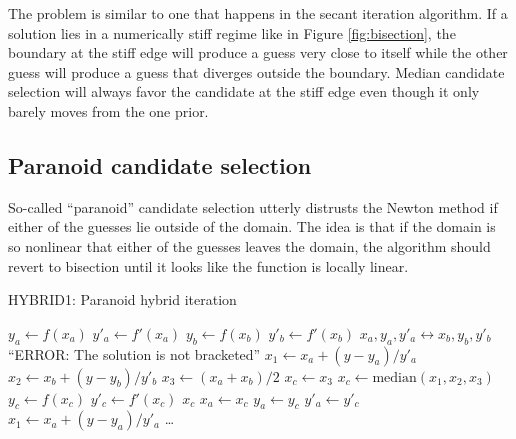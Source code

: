 The problem is similar to one that happens in the secant iteration algorithm.  If a solution lies in a numerically stiff regime like in Figure \ref{fig:bisection}, the boundary at the stiff edge will produce a guess very close to itself while the other guess will produce a guess that diverges outside the boundary.  Median candidate selection will always favor the candidate at the stiff edge even though it only barely moves from the one prior.

\subsection{Paranoid candidate selection}

So-called ``paranoid'' candidate selection utterly distrusts the Newton method if either of the guesses lie outside of the domain.  The idea is that if the domain is so nonlinear that either of the guesses leaves the domain, the algorithm should revert to bisection until it looks like the function is locally linear.

\begin{algorithm}
\caption{HYBRID1: Paranoid hybrid iteration}\label{alg:hybrid1:paranoid}
\begin{algorithmic}
\State $y_a \gets f(x_a)$   
\State $y'_a \gets f'(x_a)$
\State $y_b \gets f(x_b)$
\State $y'_b \gets f'(x_b)$
    \State $x_a,y_a,y'_a \leftrightarrow x_b,y_b,y'_b$  
\EndIf
{}
    \State \Return ``ERROR: The solution is not bracketed''
\EndIf
\State $x_1 \gets x_a + (y-y_a)/y'_a$   
\State $x_2 \gets x_b + (y-y_b)/y'_b$
\State $x_3 \gets (x_a + x_b)/2$
     
    \State {}
        \State $x_c \gets x_3$ 
    \Else
        \State $x_c \gets \mathrm{median}(x_1,x_2,x_3)$ 
    \EndIf
    \State $y_c \gets f(x_c)$ 
    \State $y'_c\gets f'(x_c)$ 
     
        \State \Return $x_c$
    \EndIf
     
        \State $x_a \gets x_c$ 
        \State $y_a \gets y_c$
        \State $y'_a \gets y'_c$
        \State $x_1 \gets x_a + (y - y_a)/y'_a$ 
        \State \ldots
{}
\end{algorithmic}
\end{algorithm}

